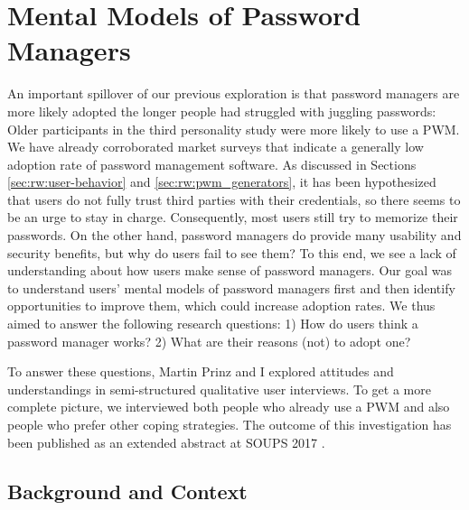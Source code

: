 \chapter[Mental Models of Password Managers]{Mental Models of Password Managers}\label{chap:mental_models_pwm}

An important spillover of our previous exploration is that password managers are more likely adopted the longer people had struggled with juggling passwords: Older participants in the third personality study were more likely to use a \gls{PWM}. We have already corroborated market surveys that indicate a generally low adoption rate of password management software. As discussed in Sections \ref{sec:rw:user-behavior} and \ref{sec:rw:pwm_generators}, it has been hypothesized that users do not fully trust third parties with their credentials, so there seems to be an urge to stay in charge. Consequently, most users still try to memorize their passwords. On the other hand, password managers do provide many usability and security benefits, but why do users fail to see them? To this end, we see a lack of understanding about how users make sense of password managers. Our goal was to understand users' mental models of password managers first and then identify opportunities to improve them, which could increase adoption rates. 
We thus aimed to answer the following research questions: 1) How do users think a password manager works? 2) What are their reasons (not) to adopt one?

To answer these questions, Martin Prinz and I explored attitudes and understandings in semi-structured qualitative user interviews. To get a more complete picture, we interviewed both people who already use a \gls{PWM} and also people who prefer other coping strategies. The outcome of this investigation has been published as an extended abstract at SOUPS 2017 \cite{Prinz2017MentalModel}.

\section{Background and Context}

